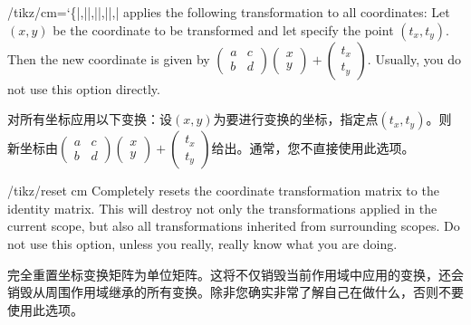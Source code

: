 \begin{key}{/tikz/cm={\ttfamily\char`\{}|,||,||,||,|}
    applies the following transformation to all coordinates: Let $(x,y)$ be the
    coordinate to be transformed and let  specify the point
    $(t_x,t_y)$. Then the new coordinate is given by
    $\left(\begin{smallmatrix} a & c \\ b & d\end{smallmatrix}\right)
    \left(\begin{smallmatrix} x \\ y \end{smallmatrix}\right) +
    \left(\begin{smallmatrix} t_x \\ t_y \end{smallmatrix}\right)$.
    Usually, you do not use this option directly.

    对所有坐标应用以下变换：设$(x,y)$为要进行变换的坐标，指定点$(t_x,t_y)$。则新坐标由$\left(\begin{smallmatrix} a & c \\ b & d\end{smallmatrix}\right)\left(\begin{smallmatrix} x \\ y \end{smallmatrix}\right)+\left(\begin{smallmatrix} t_x \\ t_y \end{smallmatrix}\right)$给出。通常，您不直接使用此选项。

\begin{codeexample}[]
\end{codeexample}
\end{key}

\begin{key}{/tikz/reset cm}
    Completely resets the coordinate transformation matrix to the identity
    matrix. This will destroy not only the transformations applied in the
    current scope, but also all transformations inherited from surrounding
    scopes. Do not use this option, unless you really, really know what you are
    doing.

    完全重置坐标变换矩阵为单位矩阵。这将不仅销毁当前作用域中应用的变换，还会销毁从周围作用域继承的所有变换。除非您确实非常了解自己在做什么，否则不要使用此选项。


\end{key}


